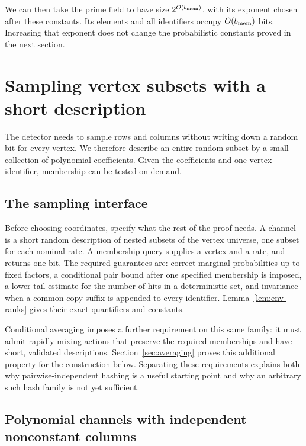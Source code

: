 \documentclass[11pt]{article}
\numberwithin{equation}{section}
\theoremstyle{definition}
\theoremstyle{remark}
\begin{document}
We can then take the prime field to have size $2^{O({b_{\rm mem}})}$, with its
exponent chosen after these constants. Its elements and all identifiers
occupy $O({b_{\rm mem}})$ bits. Increasing that exponent does not change the
probabilistic constants proved in the next section.





\section{Sampling vertex subsets with a short description}\label{sec:env}

The detector needs to sample rows and columns without writing down a random bit for every vertex. We therefore describe an entire random subset by a small collection of polynomial coefficients. Given the coefficients and one vertex identifier, membership can be tested on demand.

\subsection{The sampling interface}

Before choosing coordinates, specify what the rest of the proof needs. A channel is a short random description of nested subsets of the vertex universe, one subset for each nominal rate. A membership query supplies a vertex and a rate, and returns one bit. The required guarantees are: correct marginal probabilities up to fixed factors, a conditional pair bound after one specified membership is imposed, a lower-tail estimate for the number of hits in a deterministic set, and invariance when a common copy suffix is appended to every identifier. Lemma~\ref{lem:env-ranks} gives their exact quantifiers and constants.

Conditional averaging imposes a further requirement on this same family: it must admit rapidly mixing actions that preserve the required memberships and have short, validated descriptions. Section~\ref{sec:averaging} proves this additional property for the construction below. Separating these requirements explains both why pairwise-independent hashing is a useful starting point and why an arbitrary such hash family is not yet sufficient.

\subsection{Polynomial channels with independent nonconstant columns}
\end{document}
